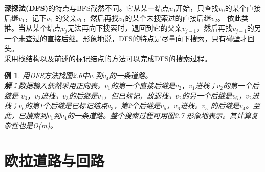 \documentclass[11pt,a4paper,openany]{book}
\newtheorem{sample}{\textbf{例}}[section]
\begin{document}
\indent \textbf{深探法(DFS)}的特点与BFS截然不同。它从某一结点$v_0$开始，只查找$v_0$的某个直接后继$v_1$，记下$v_1$ 的父亲$v_0$，然后再找$v_1$的某个未搜索过的直接后继$v_2$。 依此类推。当从某个结点$v_j$无法再向下搜索时，退回到它的父亲$v_{j-1}$，然后再找$v_{j-1}$的另一个未查过的直接后继。形象地说，DFS的特点是尽量向下搜索，只有碰壁才回头。\\
\indent 采用栈结构以及前述的标记结点的方法可以完成DFS的搜索过程。\\
\begin{sample}
 用DFS方法找图2.6中$v_1$到$v_4$的一条道路。\\
 \textbf{解：}数据输入依然采用正向表。$v_1$的第一个直接后继是$v_2，v_1$进栈；$v_2$的第一个后继是 $v_3，v_2$进栈。$v_3$的后继是$v_1$，但已标记，故退栈。$v_2$的另一个后继是$v_6$，$v_2$进栈；$v_6$的第1个后继是已标记结点$v_3$，第2个后继是$v_5$，$v_6$进栈。$v_5$ 的后继是$v_4$。至此，已搜索到$v_1$到$v_4$的一条道路。整个搜索过程可用图2.7 形象地表示。其计算复杂性也是O(m)。
\end{sample}
\section{欧拉道路与回路}
\end{document}
